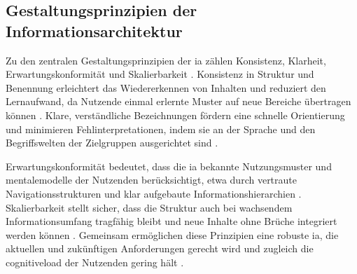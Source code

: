 \subsection{Gestaltungsprinzipien der Informationsarchitektur}
\label{subsec:02-03-03_ia-design-principles}

Zu den zentralen Gestaltungsprinzipien der \Gls{ia} zählen Konsistenz, Klarheit, Erwartungskonformität und Skalierbarkeit \cite{303:Rosenfeld2015,414:Johnson2021}. Konsistenz in Struktur und Benennung erleichtert das Wiedererkennen von Inhalten und reduziert den Lernaufwand, da Nutzende einmal erlernte Muster auf neue Bereiche übertragen können \cite{414:Johnson2021,202:NielsenHeuristics2021}. Klare, verständliche Bezeichnungen fördern eine schnelle Orientierung und minimieren Fehlinterpretationen, indem sie an der Sprache und den Begriffswelten der Zielgruppen ausgerichtet sind \cite{303:Rosenfeld2015,415:Krug2014}.

Erwartungskonformität bedeutet, dass die \Gls{ia} bekannte Nutzungsmuster und \gls{mentalemodelle} der Nutzenden berücksichtigt, etwa durch vertraute Navigationsstrukturen und klar aufgebaute Informationshierarchien \cite{415:Krug2014,107:NNGRealWorld2024}. Skalierbarkeit stellt sicher, dass die Struktur auch bei wachsendem Informationsumfang tragfähig bleibt und neue Inhalte ohne Brüche integriert werden können \cite{303:Rosenfeld2015,108:ArangoFirstPrinciples2024}. Gemeinsam ermöglichen diese Prinzipien eine robuste \Gls{ia}, die aktuellen und zukünftigen Anforderungen gerecht wird und zugleich die \gls{cognitiveload} der Nutzenden gering hält \cite{303:Rosenfeld2015,105:Sweller1988}.
